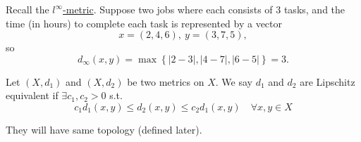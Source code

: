 \begin{eg}
    Recall the \hyperref[def: linf-metric]{\(l^{\infty} \)-metric}. Suppose two jobs where each consists of \(3\) tasks, and the time (in hours) to complete each task is represented by a vector 
    \[
        x = (2, 4, 6), \ y = (3, 7, 5),
    \]  so 
    \[
        d_\infty (x, y) = \max \left\{ \vert 2 - 3 \vert, \vert 4 - 7 \vert, \vert 6 - 5 \vert \right\} = 3. 
    \]
\end{eg}

\begin{definition} \label{def: Lipschitz equivalent metric}
    Let \((X, d_1)\) and \((X, d_2)\) be two metrics on \(X\). We say \(d_1\) and \(d_2\) are Lipschitz equivalent if \(\exists c_1, c_2 > 0\) s.t. 
    \[
        c_1 d_1(x, y) \le d_2(x, y) \le c_2 d_1(x, y) \quad \forall x, y \in X
    \] 
\end{definition} 
\begin{remark}
    They will have same topology (defined later).
\end{remark}

